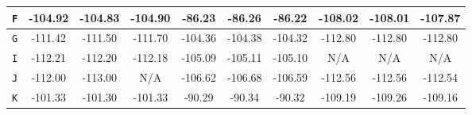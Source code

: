 \begin{table}[ht]
\begin{tabular}{|c|c|c|c|c|c|c|c|c|c|}
            \texttt{F} & -104.92                               & -104.83                                 & -104.90                                & -86.23         & -86.26         & -86.22         & -108.02        & -108.01        & -107.87        \\ \hline
            \texttt{G} & -111.42                               & -111.50                                 & -111.70                                & -104.36        & -104.38        & -104.32        & -112.80        & -112.80        & -112.80        \\ \hline
            \texttt{I} & -112.21                               & -112.20                                 & -112.18                                & -105.09        & -105.11        & -105.10        & N/A            & N/A            & N/A            \\ \hline
            \texttt{J} & -112.00                               & -113.00                                 & N/A                                    & -106.62        & -106.68        & -106.59        & -112.56        & -112.56        & -112.54        \\ \hline
            \texttt{K} & -101.33                               & -101.30                                 & -101.33                                & -90.29         & -90.34         & -90.32         & -109.19        & -109.26        & -109.16        \\ \hline
      \end{tabular}
      \label{table:rssi}
\end{table}

